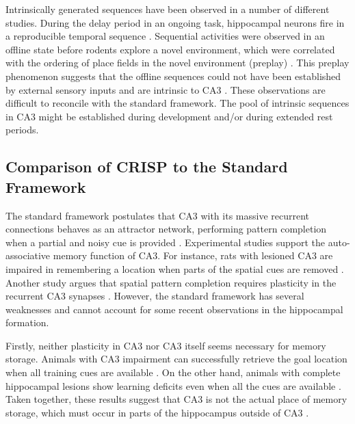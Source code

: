 \documentclass[utf8]{frontiersSCNS} %
\begin{document}
Intrinsically generated sequences have been observed in a number of different studies. During the delay period in an ongoing task, hippocampal neurons fire in a reproducible temporal sequence \cite{pastalkova2008internally, macdonald2011hippocampal}.  Sequential activities were observed in an offline state before rodents explore a novel environment, which were correlated with the ordering of place fields in the novel environment (preplay) \cite{dragoi2011preplay}. This preplay phenomenon suggests that the offline sequences could not have been established by external sensory inputs and are intrinsic to CA3 \cite{azizi2013computational}. These observations are difficult to reconcile with the standard framework. The pool of intrinsic sequences in CA3 might be established during development and/or during extended rest periods.  


\subsection{Comparison of CRISP to the Standard Framework}

The standard framework postulates that CA3 with its massive recurrent connections behaves as an attractor network, performing pattern completion when a partial and noisy cue is provided \cite{mcnaughton1987hippocampal, rolls2007attractor}. Experimental studies support the auto-associative memory function of CA3. For instance, rats with lesioned CA3 are impaired in remembering a location when parts of the spatial cues are removed \cite{gold2005role}. Another study argues that spatial pattern completion requires plasticity in the recurrent CA3 synapses \cite{nakazawa2002requirement}. However, the standard framework has several weaknesses and cannot account for some recent observations in the hippocampal formation. 

Firstly, neither plasticity in CA3 nor CA3 itself seems necessary for memory storage. Animals with CA3 impairment can successfully retrieve the goal location when all training cues are available \cite{nakazawa2002requirement, gold2005role, fellini2009pharmacological}. On the other hand, animals with complete hippocampal lesions show learning deficits even when all the cues are available \cite{gilbert1998memory, morris1982place}. Taken together, these results suggest that CA3 is not the actual place of memory storage, which must occur in parts of the hippocampus outside of CA3 \cite{cheng2013crisp}. 
\end{document}
